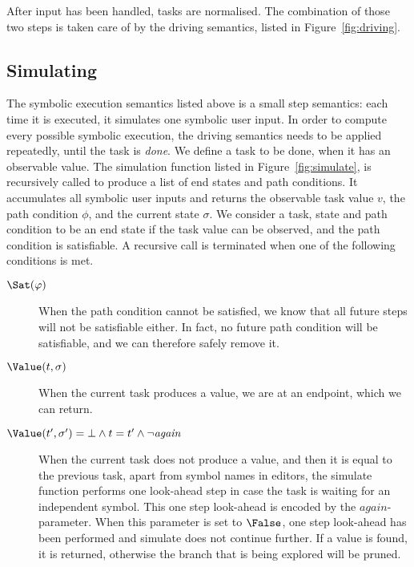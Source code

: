 After input has been handled, tasks are normalised.
The combination of those two steps is taken care of by the driving semantics, listed in Figure~\ref{fig:driving}.


\subsection{Simulating}
\label{subsec:driving}

The symbolic execution semantics listed above is a small step semantics:
each time it is executed, it simulates one symbolic user input.
In order to compute every possible symbolic execution, the driving semantics needs to be applied repeatedly, until the task is \emph{done}.
We define a task to be done, when it has an observable value.
The simulation function listed in Figure~\ref{fig:simulate}, is recursively called to produce a list of end states and path conditions.
It accumulates all symbolic user inputs and returns the observable task value $v$, the path condition $\phi$, and the current state $\sigma$.
We consider a task, state and path condition to be an end state if the task value can be observed, and the path condition is satisfiable.
A recursive call is terminated when one of the following conditions is met.

\begin{description}
  \item[$\Sat(\phi)$]
    When the path condition cannot be satisfied, we know that all future steps will not be satisfiable either.
    In fact, no future path condition will be satisfiable, and we can therefore safely remove it.

  \item[$\Value(t,\sigma)$]
    When the current task produces a value, we are at an endpoint, which we can return.

  \item[$\Value(t',\sigma')=\bot\land t=t'\land \neg \mathit{again}$]
    When the current task does not produce a value, and then it is equal to the previous task, apart from symbol names in editors, the simulate function performs one look-ahead step in case the task is waiting for an independent symbol.
    This one step look-ahead is encoded by the $\mathit{again}$-parameter.
    When this parameter is set to $\False$, one step look-ahead has been performed and simulate does not continue further.
    If a value is found, it is returned, otherwise the branch that is being explored will be pruned.
\end{description}

